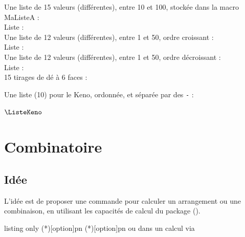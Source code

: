 \begin{PresCodePL}{}
Une liste de 15 valeurs (différentes), entre 10 et 100, stockée dans la macro MaListeA : \\
Liste : \TirageAleatoireEntiers[ValMin=10,ValMax=100,NbVal=15]{\MaListeA}\MaListeA \\

Une liste de 12 valeurs (différentes), entre 1 et 50, ordre croissant : \\
Liste : \TirageAleatoireEntiers[ValMin=1,ValMax=50,NbVal=12,Tri=croissant]%
	{\MaListeB}\MaListeB \\

Une liste de 12 valeurs (différentes), entre 1 et 50, ordre décroissant : \\
Liste : \TirageAleatoireEntiers[ValMin=1,ValMax=50,NbVal=12,Tri=decroissant]%
	{\MaListeC}\MaListeC \\

15 tirages de dé à 6 faces : \\ \TirageAleatoireEntiers[ValMin=1,ValMax=6,NbVal=15,Repetition]{\TestDes}\TestDes
\end{PresCodePL}

\begin{PresCodePL}{}
Une liste (10) pour le Keno\textcopyright, ordonnée, et séparée par des \texttt{-} :

\TirageAleatoireEntiers[ValMin=1,ValMax=70,NbVal=10,Tri=croissant,Sep={-}]{\ListeKeno}
$\ListeKeno$

\setsepchar{-}\readlist*\KENO{\ListeKeno}\showitems{\KENO}
\end{PresCodePL}

\newpage

\section{Combinatoire}\label{combinatoire}

\subsection{Idée}

\begin{tipblock}
L'idée est de proposer une commande pour calculer un arrangement ou une combinaison, en utilisant les capacités de calcul du package  ().
\end{tipblock}

\begin{PresCodeTexPL}{listing only}
\Arrangement(*)[option]{p}{n}
\Combinaison(*)[option]{p}{n}
 ou  dans un calcul via 
\end{PresCodeTexPL}

